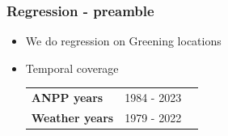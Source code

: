 \documentclass[serif, xcolor={dvipsnames}]{beamer} %
\begin{document}
\begin{frame}
\frametitle{Regression - preamble}
\begin{itemize}[<+->]
\item We do regression on Greening locations

\item Temporal coverage
\begin{table}[!ht]
\centering
\captionsetup{singlelinecheck=false, format=hang}
\label{tab:NPPWeatherYears}
\begin{tabular}{lll}
\bottomrule
\rowcolor{shadecolor} \textbf{ANPP years} &  1984 - 2023   \\ 
\textbf{Weather years}  & 1979 - 2022 \\
\toprule
\end{tabular}
\end{table}
\end{itemize}

\end{frame}
\end{document}

